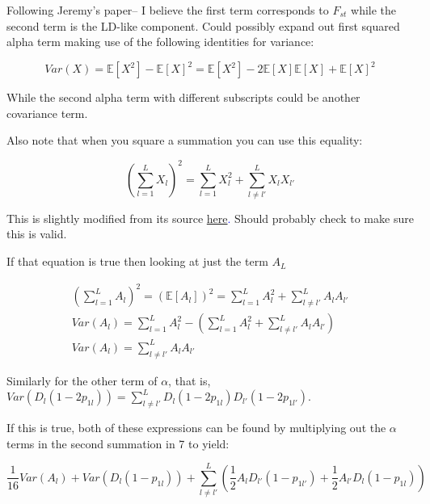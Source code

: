 \documentclass[a4paper,10pt]{article}
\begin{document}
Following Jeremy's paper-- I believe the first term corresponds to $F_{st}$ while the second term is the LD-like component. Could possibly expand out first squared alpha term making use of the following identities for variance: 

\begin{equation}
   \label{3}
   Var(X) = \mathbb{E}[X^2] - \mathbb{E}[X]^2
   = \mathbb{E}[X^2] - 2\mathbb{E}[X]\mathbb{E}[X] + \mathbb{E}[X]^2
\end{equation}

While the second alpha term with different subscripts could be another covariance term. 

Also note that when you square a summation you can use this equality: 

\begin{equation}
    \label{4}
    (\sum^L_{l=1} X_l )^2 = \sum^L_{l=1} X_l^2 + \sum^L_{l \neq l'} X_l X_{l'}
\end{equation}

This is slightly modified from its source \textcolor{blue}{\href{https://math.stackexchange.com/questions/329344/what-is-the-square-of-summation}{here}.} Should probably check to make sure this is valid.

If that equation is true then looking at just the term $A_L$

\begin{align}
    (\sum^L_{l=1} A_l )^2 = (\mathbb{E}[A_l])^2 = \sum^L_{l=1} A_l^2 + \sum^L_{l \neq l'} A_l A_{l'} \\
    Var(A_l) = \sum^L_{l=1} A_l^2 - (\sum^L_{l=1} A_l^2 + \sum^L_{l \neq l'} A_l A_{l'}) \\
    Var(A_l)= \sum^L_{l \neq l'} A_l A_{l'}
\end{align}

Similarly for the other term of $\alpha$, that is, $Var(D_l(1-2p_{1l})) = \sum^L_{l \neq l'} D_l(1-2p_{1l}) D_{l'}(1-2p_{1l'})$.

If this is true, both of these expressions can be found by multiplying out the $\alpha$ terms in the second summation in 7 to yield: 

\begin{equation}
    \frac{1}{16} Var(A_l) + Var(D_{l}(1-p_{1l})) + \sum_{l \neq l'}^L ( \frac{1}{2}A_l D_{l'}(1-p_{1l'}) + \frac{1}{2}A_{l'} D_{l}(1-p_{1l}) )
\end{equation}



\end{document}
